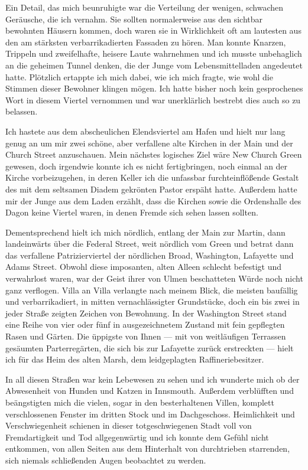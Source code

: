 Ein Detail, das mich beunruhigte war die Verteilung der wenigen, schwachen Geräusche, die ich vernahm. Sie sollten normalerweise aus den sichtbar bewohnten Häusern kommen, doch waren sie in Wirklichkeit oft am lautesten aus den am stärksten verbarrikadierten Fassaden zu hören. Man konnte Knarzen, Trippeln und zweifelhafte, heisere Laute wahrnehmen und ich musste unbehaglich an die geheimen Tunnel denken, die der Junge vom Lebensmittelladen angedeutet hatte. Plötzlich ertappte ich mich dabei, wie ich mich fragte, wie wohl die Stimmen dieser Bewohner klingen mögen. Ich hatte bisher noch kein gesprochenes Wort in diesem Viertel vernommen und war unerklärlich bestrebt dies auch so zu belassen.

Ich hastete aus dem abscheulichen Elendsviertel am Hafen und hielt nur lang genug an um mir zwei schöne, aber verfallene alte Kirchen in der Main und der Church Street anzuschauen. Mein nächstes logisches Ziel wäre New Church Green gewesen, doch irgendwie konnte ich es nicht fertigbringen, noch einmal an der Kirche vorbeizugehen, in deren Keller ich die unfassbar furchteinflößende Gestalt des mit dem seltsamen Diadem gekrönten Pastor erspäht hatte. Außerdem hatte mir der Junge aus dem Laden erzählt, dass die Kirchen sowie die Ordenshalle des Dagon keine Viertel waren, in denen Fremde sich sehen lassen sollten.

Dementsprechend hielt ich mich nördlich, entlang der Main zur Martin, dann landeinwärts über die Federal Street, weit nördlich vom Green und betrat dann das verfallene Patrizierviertel der nördlichen Broad, Washington, Lafayette und Adams Street. Obwohl diese imposanten, alten Alleen schlecht befestigt und verwahrlost waren, war der Geist ihrer von Ulmen beschatteten Würde noch nicht ganz verflogen. Villa an Villa verlangte nach meinem Blick, die meisten baufällig und verbarrikadiert, in mitten vernachlässigter Grundstücke, doch ein bis zwei in jeder Straße zeigten Zeichen von Bewohnung. In der Washington Street stand eine Reihe von vier oder fünf in ausgezeichnetem Zustand mit fein gepflegten Rasen und Gärten. Die üppigste von Ihnen --- mit von weitläufigen Terrassen gesäumten Parterregärten, die sich bis zur Lafayette zurück erstreckten --- hielt ich für das Heim des alten Marsh, dem leidgeplagten Raffineriebesitzer.

In all diesen Straßen war kein Lebewesen zu sehen und ich wunderte mich ob der Abwesenheit von Hunden und Katzen in Innsmouth. Außerdem verblüfften und beängstigten mich die vielen, sogar in den besterhaltenen Villen, komplett verschlossenen Fenster im dritten Stock und im Dachgeschoss. Heimlichkeit und Verschwiegenheit schienen in dieser totgeschwiegenen Stadt voll von Fremdartigkeit und Tod allgegenwärtig und ich konnte dem Gefühl nicht entkommen, von allen Seiten aus dem Hinterhalt von durchtrieben starrenden, sich niemals schließenden Augen beobachtet zu werden.

